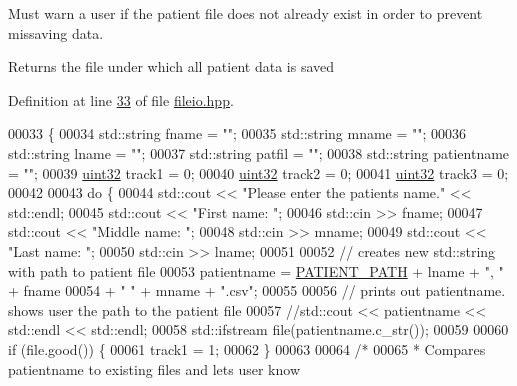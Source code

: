 Must warn a user if the patient file does not already exist in order to prevent missaving data.

\begin{DoxyReturn}{Returns}
the file under which all patient data is saved 
\end{DoxyReturn}


Definition at line \hyperlink{fileio_8hpp_source_l00033}{33} of file \hyperlink{fileio_8hpp_source}{fileio.\+hpp}.


\begin{DoxyCode}
00033                             \{
00034         std::string fname = \textcolor{stringliteral}{""};
00035         std::string mname = \textcolor{stringliteral}{""};
00036         std::string lname = \textcolor{stringliteral}{""};
00037         std::string patfil = \textcolor{stringliteral}{""};
00038         std::string patientname = \textcolor{stringliteral}{""};
00039         \hyperlink{definitions_8hpp_a1134b580f8da4de94ca6b1de4d37975e}{uint32} track1 = 0;
00040         \hyperlink{definitions_8hpp_a1134b580f8da4de94ca6b1de4d37975e}{uint32} track2 = 0;
00041         \hyperlink{definitions_8hpp_a1134b580f8da4de94ca6b1de4d37975e}{uint32} track3 = 0;
00042 
00043         \textcolor{keywordflow}{do} \{
00044             std::cout << \textcolor{stringliteral}{"Please enter the patients name."} << std::endl;
00045             std::cout << \textcolor{stringliteral}{"First name: "};
00046             std::cin >> fname;
00047             std::cout << \textcolor{stringliteral}{"Middle name: "};
00048             std::cin >> mname;
00049             std::cout << \textcolor{stringliteral}{"Last name: "};
00050             std::cin >> lname;
00051 
00052             \textcolor{comment}{// creates new std::string with path to patient file}
00053             patientname = \hyperlink{definitions_8hpp_a5736990e7ea949fc1971afa00e421f16}{PATIENT\_PATH} + lname + \textcolor{stringliteral}{", "} + fname
00054                 + \textcolor{stringliteral}{" "} + mname + \textcolor{stringliteral}{".csv"};
00055 
00056             \textcolor{comment}{// prints out patientname. shows user the path to the patient file}
00057             \textcolor{comment}{//std::cout << patientname << std::endl << std::endl;}
00058             std::ifstream file(patientname.c\_str());
00059 
00060             \textcolor{keywordflow}{if} (file.good()) \{
00061                 track1 = 1;
00062             \}
00063 
00064             \textcolor{comment}{/*}
00065 \textcolor{comment}{             * Compares patientname to existing files and lets user know}

\end{DoxyCode}
